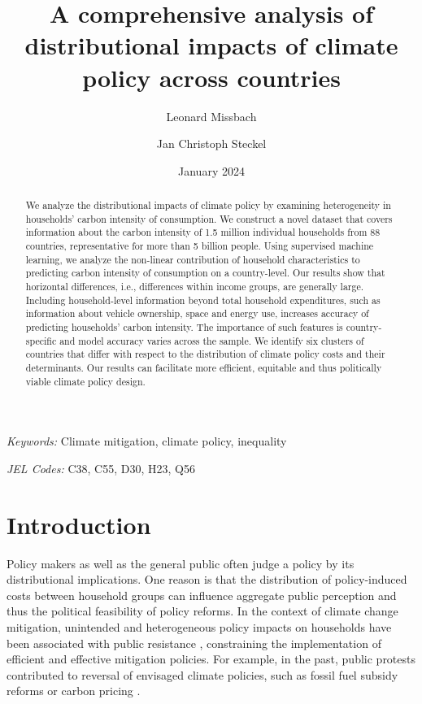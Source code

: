 \documentclass[12pt, a4paper]{article}
\title{A comprehensive analysis of distributional impacts of climate policy across countries
}
\author[1,2,*]{Leonard Missbach}
\author[1,3]{Jan Christoph Steckel}
\affil[1]{\small Mercator Research Institute on Global Commons and Climate Change, Berlin, Germany}
\affil[2]{\small Technical University of Berlin, Berlin, Germany}
\affil[3]{\small Brandenburg University of Technology Cottbus Senftenberg, Cottbus, Germany}
\affil[*]{\normalsize Corresponding author: \href{mailto:missbach@mcc-berlin.net}{missbach@mcc-berlin.net}}
\date{January 2024}
\begin{document}
\maketitle
\begin{abstract}
  We analyze the distributional impacts of climate policy by examining heterogeneity in households' carbon intensity of consumption. We construct a novel dataset that covers information about the carbon intensity of 1.5 million individual households from 88 countries, representative for more than 5 billion people. Using supervised machine learning, we analyze the non-linear contribution of household characteristics to predicting carbon intensity of consumption on a country-level.
   Our results show that horizontal differences, i.e., differences within income groups, are generally large. Including household-level information beyond total household expenditures, such as information about vehicle ownership, space and energy use, increases accuracy of predicting households' carbon intensity. The importance of such features is country-specific and model accuracy varies across the sample. We identify six clusters of countries that differ with respect to the distribution of climate policy costs and their determinants. Our results can facilitate more efficient, equitable and thus politically viable climate policy design.   
\end{abstract}

\smallskip

\noindent \small \textit{Keywords:} Climate mitigation, climate policy, inequality

\noindent \small \textit{JEL Codes:} C38, C55, D30, H23, Q56

\thispagestyle{empty}
\clearpage
\setcounter{page}{1}

\normalsize

\section{Introduction} \label{sec:introduction}

Policy makers as well as the general public often judge a policy by its distributional implications. One reason is that the distribution of policy-induced costs between household groups can influence aggregate public perception and thus the political feasibility of policy reforms. In the context of climate change mitigation, unintended and heterogeneous policy impacts on households have been associated with public resistance \autocite{MaestreAndres.2019,Dechezlepretre.2022}, constraining the implementation of efficient and effective mitigation policies. For example, in the past, public protests contributed to reversal of envisaged climate policies, such as fossil fuel subsidy reforms \autocite{Clements.2013} or carbon pricing \autocite{Douenne.2020c}.
\end{document}

